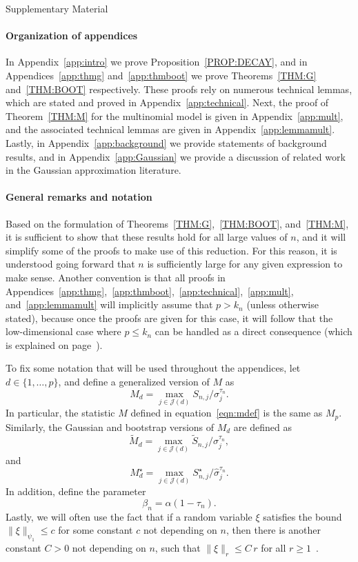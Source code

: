 \documentclass[aos,preprint]{imsart}
\numberwithin{equation}{section}
\theoremstyle{plain}
\renewcommand{\hat}[1]{\widehat{#1}}
\newcommand{\J}{\mathcal{J}}
\newcommand{\1}{{\bf{1}}}
\newcommand{\0}{\mathbf{0}}
\begin{document}
\newpage
\begin{center}
\Large{Supplementary Material}
\end{center}

\paragraph{Organization of appendices} 
 In Appendix~\ref{app:intro} we prove Proposition~\ref{PROP:DECAY}, and in Appendices~\ref{app:thmg} and~\ref{app:thmboot} we prove Theorems~\ref{THM:G} and~\ref{THM:BOOT} respectively. These proofs rely on numerous technical lemmas, which are stated and proved in Appendix~\ref{app:technical}. Next, the proof of Theorem~\ref{THM:M} for the multinomial model is given in Appendix~\ref{app:mult}, and the associated technical lemmas are given in Appendix~\ref{app:lemmamult}. Lastly, in Appendix~\ref{app:background} we provide statements of background results, and in Appendix~\ref{app:Gaussian} we provide a discussion of related work in the Gaussian approximation literature.

\paragraph{General remarks and notation} Based on the formulation of Theorems~\ref{THM:G},~\ref{THM:BOOT}, and~\ref{THM:M}, it is sufficient to show that these results hold for all large values of $n$, and it will simplify some of the proofs to make use of this reduction. For this reason, it is  understood going forward that $n$ is sufficiently large for any given expression to make sense. Another convention is that all proofs in 
Appendices~\ref{app:thmg},~\ref{app:thmboot},~\ref{app:technical},~\ref{app:mult}, and~\ref{app:lemmamult} will implicitly assume that $p>k_n$ (unless otherwise stated), because once the proofs are given for this case, it will follow that the low-dimensional case where $p\leq k_n$ can be handled as a direct consequence (which is explained on page~\pageref{lowdimcase}).

To fix some notation that will be used throughout the appendices, let $d\in\{1,\dots,p\}$, and define a generalized version of $M$ as
$$M_d=\max_{j\in\J(d)}S_{n,j}/\sigma_j^{\tau_n}.$$
In particular, the statistic $M$ defined in equation~\eqref{eqn:mdef} is the same as $M_p$.
Similarly, the Gaussian and bootstrap versions of $M_d$ are defined as
$$\tilde M_d=\max_{j\in\J(d)}\tilde S_{n,j}/\sigma_j^{\tau_n},$$
and
$$M_d^{\star} =\max_{j\in\J(d)}S_{n,j}^{\star}/\hat\sigma_j^{\tau_n}.$$
 In addition, define the parameter
\begin{equation}
\beta_n=\alpha(1-\tau_n).
\end{equation}
%
Lastly, we will often use the fact that if a random variable $\xi$ satisfies the bound $\|\xi\|_{\psi_1}\leq c$ for some constant $c$ not depending on $n$, then there is another constant $C>0$ not depending on $n$, such that $\|\xi\|_r\leq C\, r$ for all $r\geq 1$~\cite[Proposition 2.7.1]{VershyninHDP}.
\end{document}
